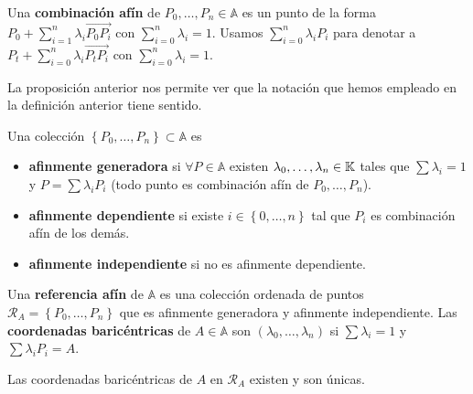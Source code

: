 \begin{definition}
Una \textbf{combinación afín} de $\displaystyle P_{0}, \ldots, P_{n} \in \mathbb{A} $ es un punto de la forma $\displaystyle P_{0} + \sum^{n}_{i = 1}\lambda_{i}\overrightarrow{P_{0}P_{i}} $ con $\displaystyle \sum^{n}_{i = 0}\lambda_{i} = 1 $. Usamos $\displaystyle \sum^{n}_{i = 0}\lambda_{i}P_{i} $ para denotar a $\displaystyle P_{t}+\sum^{n}_{i = 0}\lambda_{i}\overrightarrow{P_{t}P_{i}} $ con $\displaystyle \sum^{n}_{i = 0}\lambda_{i} = 1 $.
\end{definition}
\begin{observation}
La proposición anterior nos permite ver que la notación que hemos empleado en la definición anterior tiene sentido. 
\end{observation}
\begin{definition}
	Una colección $\displaystyle \left\{ P_{0}, \ldots, P_{n}\right\} \subset \mathbb{A} $ es  
	\begin{itemize}
	\item \textbf{afinmente generadora} si $\displaystyle \forall P \in \mathbb{A} $ existen $\displaystyle \lambda_{0}, \ldots, \lambda_{n} \in \mathbb{K} $ tales que $\displaystyle \sum\lambda_{i} = 1 $ y $\displaystyle P = \sum\lambda_{i}P_{i} $ (todo punto es combinación afín de $\displaystyle P_{0}, \ldots, P_{n} $).
	\item  \textbf{afinmente dependiente} si existe $\displaystyle i \in \left\{ 0, \ldots, n\right\}  $ tal que $\displaystyle P_{i} $ es combinación afín de los demás. 
	\item  \textbf{afinmente independiente} si no es afinmente dependiente.
	\end{itemize}
\end{definition}
\begin{definition}
	Una \textbf{referencia afín} de $\displaystyle \mathbb{A} $ es una colección ordenada de puntos $\displaystyle \mathcal{R}_{A} = \left\{ P_{0}, \ldots, P_{n}\right\}  $ que es afinmente generadora y afinmente independiente. Las \textbf{coordenadas baricéntricas} de $\displaystyle A \in \mathbb{A} $ son $\displaystyle \left(\lambda_{0}, \ldots, \lambda_{n}\right) $ si $\displaystyle \sum\lambda_{i} = 1 $ y $\displaystyle \sum\lambda_{i}P_{i} = A $.
\end{definition}
\begin{prop}
Las coordenadas baricéntricas de $\displaystyle A $ en $\displaystyle \mathcal{R}_{A} $ existen y son únicas. 
\end{prop}
